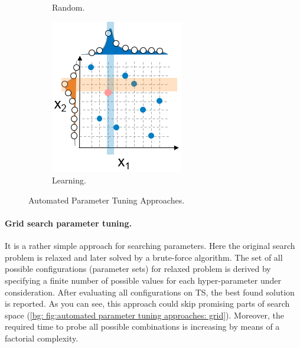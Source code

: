 \begin{figure}
\begin{subfigure}[b]{0.25\linewidth}
		\caption{Random.}
		\label{bg: fig:automated parameter tuning approaches: random}
	\end{subfigure}
	\begin{subfigure}[b]{0.25\linewidth}
		\includegraphics[width=\linewidth]{graphics/Background/hyperparameter-learning-search.png}
		\caption{Learning.}
		\label{bg: fig:automated parameter tuning approaches: learning}
	\end{subfigure}
	\caption{Automated Parameter Tuning Approaches.}
	\label{bg: fig:automated parameter tuning approaches}
\end{figure}

\paragraph{Grid search parameter tuning.} It is a rather simple approach for searching parameters. Here the original search problem is relaxed and later solved by a brute-force algorithm. The set of all possible configurations (parameter sets) for relaxed problem is derived by specifying a finite number of possible values for each hyper-parameter under consideration. After evaluating all configurations on TS, the best found solution is reported. As you can see, this approach could skip promising parts of search space (\cref{bg: fig:automated parameter tuning approaches: grid}). Moreover, the required time to probe all possible combinations is increasing by means of a factorial complexity.

